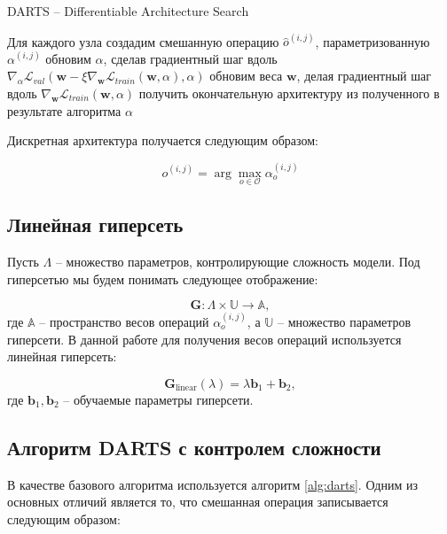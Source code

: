 \documentclass[12pt, twoside]{article}
\begin{document}
\begin{algorithm}[H]
\begin{algorithmic}[1]
\caption{DARTS -- Differentiable Architecture Search}
\label{alg:darts}
\STATE Для каждого узла создадим смешанную операцию $\hat{o}^{(i, j)}$, параметризованную $\alpha^{(i, j)}$
\STATE  обновим $\alpha$, сделав градиентный шаг вдоль $\nabla_\alpha \mathcal{L}_{val}(\mathbf{w} - \xi\nabla_{\mathbf{w}}\mathcal{L}_{train}(\mathbf{w}, \alpha), \alpha)$
\STATE обновим веса $\mathbf{w}$, делая градиентный шаг вдоль $\nabla_\mathbf{w}\mathcal{L}_{train}(\mathbf{w}, \alpha)$
\ENDWHILE
\STATE получить окончательную архитектуру из полученного в результате алгоритма $\alpha$
\end{algorithmic}
\end{algorithm}

Дискретная архитектура получается следующим образом:

$$o^{(i, j)} =\arg\max_{o\in\mathcal{O}}\alpha_o^{(i, j)}$$

\subsection{Линейная гиперсеть}

Пусть $\Lambda$ --  множество параметров, контролирующие сложность модели. Под гиперсетью мы будем понимать следующее отображение:

\begin{equation}
	\mathbf{G} : \Lambda \times \mathbb{U} \rightarrow \mathbb{A},
\end{equation}
где $\mathbb{A}$ -- пространство весов операций $\alpha^{(i, j)}_o$, а $\mathbb{U}$ -- множество параметров гиперсети.
В данной работе для получения весов операций используется линейная гиперсеть:
 
 \begin{equation}\label{hypernet}
 \mathbf{G}_{\text{linear}}(\lambda) = \lambda \mathbf{b}_1 + \mathbf{b}_2,
 \end{equation}
 где $\mathbf{b}_1, \mathbf{b}_2$ -- обучаемые параметры гиперсети.
 
 \subsection{Алгоритм DARTS с контролем сложности}
 
 В качестве базового алгоритма используется алгоритм \ref{alg:darts}. Одним из основных отличий является то, что смешанная операция записывается следующим образом:
 
\end{document}
